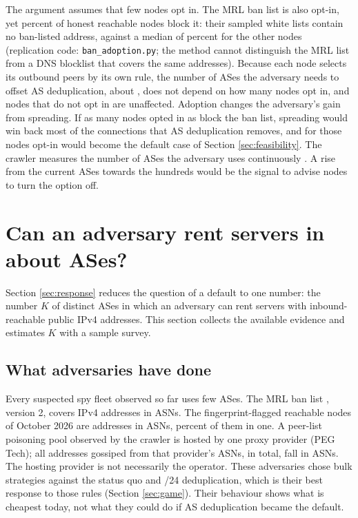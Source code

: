 \documentclass[english]{mrl}
\theoremstyle{plain}
\begin{document}
The argument assumes that few nodes opt in. The MRL ban list is also opt-in, yet \banAdoptPct{} percent of honest reachable nodes block it: their sampled white lists contain no ban-listed address, against a median of \banAdoptOthersPct{} percent for the other nodes (replication code: \texttt{ban\_adoption.py}; the method cannot distinguish the MRL list from a DNS blocklist that covers the same addresses). Because each node selects its outbound peers by its own rule, the number of ASes the adversary needs to offset AS deduplication, about \kBreakEven{}, does not depend on how many nodes opt in, and nodes that do not opt in are unaffected. Adoption changes the adversary's gain from spreading. If as many nodes opted in as block the ban list, spreading would win back most of the connections that AS deduplication removes, and for those nodes opt-in would become the default case of Section \ref{sec:feasibility}. The crawler measures the number of ASes the adversary uses continuously \cite{Observatory}. A rise from the current \spyAsnNew{} ASes towards the hundreds would be the signal to advise nodes to turn the option off.

\section{Can an adversary rent servers in about \kBreakEven{} ASes?\label{sec:feasibility}}

Section \ref{sec:response} reduces the question of a default to one number: the number $K$ of distinct ASes in which an adversary can rent servers with inbound-reachable public IPv4 addresses. This section collects the available evidence and estimates $K$ with a sample survey.

\subsection{What adversaries have done}

Every suspected spy fleet observed so far uses few ASes. The MRL ban list \cite{MRLBanList}, version 2, covers \banAddresses{} IPv4 addresses in \banAsns{} ASNs. The fingerprint-flagged reachable nodes of October 2026 are \nSpyNew{} addresses in \spyAsnNew{} ASNs, \spyTopAsnPctNew{} percent of them in one. A peer-list poisoning pool observed by the crawler is hosted by one proxy provider (PEG Tech); all addresses gossiped from that provider's ASNs, \pegIps{} in total, fall in \pegAsns{} ASNs. The hosting provider is not necessarily the operator. These adversaries chose bulk strategies against the status quo and /24 deduplication, which is their best response to those rules (Section \ref{sec:game}). Their behaviour shows what is cheapest today, not what they could do if AS deduplication became the default.
\end{document}
